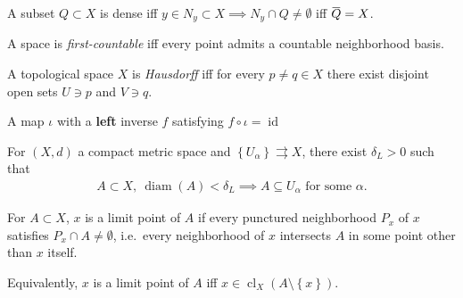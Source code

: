 \begin{definition}[Dense]

A subset \(Q\subset X\) is dense iff
\(y\in N_{y} \subset X \implies N_{y} \cap Q \neq \emptyset\) iff
\(\mkern 1.5mu\overline{\mkern-1.5muQ\mkern-1.5mu}\mkern 1.5mu = X\).

\end{definition}

\begin{definition}

A space is \emph{first-countable} iff every point admits a countable
neighborhood basis.

\end{definition}

\begin{definition}[Hausdorff]

A topological space \(X\) is \emph{Hausdorff} iff for every
\(p\neq q \in X\) there exist disjoint open sets \(U\ni p\) and
\(V\ni q\).

\end{definition}

\begin{definition}[Injection]

A map \(\iota\) with a \textbf{left} inverse \(f\) satisfying
\(f\circ \iota = \operatorname{id}\)

\end{definition}

\begin{definition}

For \((X, d)\) a compact metric space and
\(\left\{{U_\alpha}\right\}\rightrightarrows X\), there exist
\(\delta_{L} > 0\) such that
\begin{align*}
A\subset X, ~ {\operatorname{diam}}(A) < \delta_{L} \implies A\subseteq U_\alpha \text{ for some } \alpha
.\end{align*}

\end{definition}

\begin{definition}

For \(A\subset X\), \(x\) is a limit point of \(A\) if every punctured
neighborhood \(P_{x}\) of \(x\) satisfies
\(P_{x} \cap A \neq \emptyset\), i.e.~every neighborhood of \(x\)
intersects \(A\) in some point other than \(x\) itself.

Equivalently, \(x\) is a limit point of \(A\) iff
\(x\in \operatorname{cl}_{X}(A\setminus\left\{{x}\right\})\).

\end{definition}


